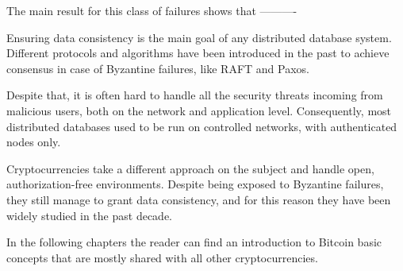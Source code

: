 The main result for this class of failures shows that ----------

Ensuring data consistency is the main goal of any distributed database system. Different protocols and algorithms have been introduced in the past to achieve consensus in case of Byzantine failures, like RAFT and Paxos.

Despite that, it is often hard to handle all the security threats incoming from malicious users, both on the network and application level. Consequently, most distributed databases used to be run on controlled networks, with authenticated nodes only.

Cryptocurrencies take a different approach on the subject and handle open, authorization-free environments. Despite being exposed to Byzantine failures, they still manage to grant data consistency, and for this reason they have been widely studied in the past decade.

In the following chapters the reader can find an introduction to Bitcoin basic concepts that are mostly shared with all other cryptocurrencies.

